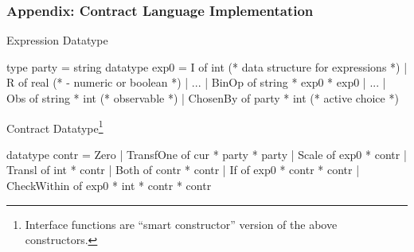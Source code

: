 \documentclass[xcolor=dvipsnames,11pt]{beamer}
\renewcommand{\emph}[1]{\textcolor{structure!90}{#1}}
\begin{document}
\begin{frame}[fragile,t]
    \frametitle{Appendix: Contract Language Implementation}
\emph{Expression Datatype}
\begin{hscode}
type party = string                       
datatype exp0 = I of int  (* data structure for expressions *)
              | R of real (*  - numeric or boolean *)
              | ...
              | BinOp of string * exp0 * exp0
              | ...
              | Obs of string * int     (* observable *)
              | ChosenBy of party * int (* active choice *)
\end{hscode}

\emph{Contract Datatype}\footnote{Interface functions are ``smart constructor'' version of the above
constructors.}
\begin{hscode}
datatype contr =
       Zero
     | TransfOne of cur * party * party
     | Scale of exp0 * contr
     | Transl of int * contr
     | Both of contr * contr
     | If of exp0 * contr * contr
     | CheckWithin of exp0 * int * contr * contr
\end{hscode}
%


\end{frame}
\end{document}
